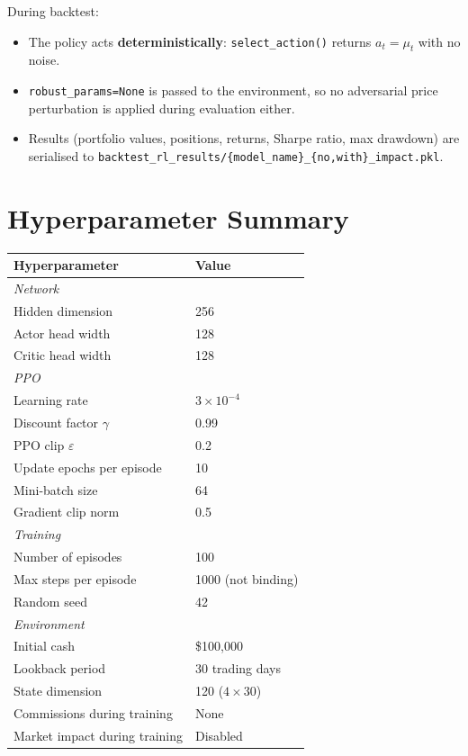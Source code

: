 \documentclass[11pt,a4paper]{article}
\begin{document}
During backtest:
\begin{itemize}
  \item The policy acts \textbf{deterministically}: \texttt{select\_action()} returns $a_t = \mu_t$ with no noise.
  \item \texttt{robust\_params=None} is passed to the environment, so no adversarial price perturbation is applied during evaluation either.
  \item Results (portfolio values, positions, returns, Sharpe ratio, max drawdown) are serialised to \texttt{backtest\_rl\_results/\{model\_name\}\_\{no,with\}\_impact.pkl}.
\end{itemize}

\section{Hyperparameter Summary}

\begin{center}
\begin{tabular}{ll}
\toprule
Hyperparameter & Value \\
\midrule
\multicolumn{2}{l}{\textit{Network}} \\
Hidden dimension & 256 \\
Actor head width & 128 \\
Critic head width & 128 \\
\midrule
\multicolumn{2}{l}{\textit{PPO}} \\
Learning rate & $3\times10^{-4}$ \\
Discount factor $\gamma$ & 0.99 \\
PPO clip $\varepsilon$ & 0.2 \\
Update epochs per episode & 10 \\
Mini-batch size & 64 \\
Gradient clip norm & 0.5 \\
\midrule
\multicolumn{2}{l}{\textit{Training}} \\
Number of episodes & 100 \\
Max steps per episode & 1000 (not binding) \\
Random seed & 42 \\
\midrule
\multicolumn{2}{l}{\textit{Environment}} \\
Initial cash & \$100{,}000 \\
Lookback period & 30 trading days \\
State dimension & 120 ($4\times30$) \\
Commissions during training & None \\
Market impact during training & Disabled \\
\bottomrule
\end{tabular}
\end{center}
\end{document}
